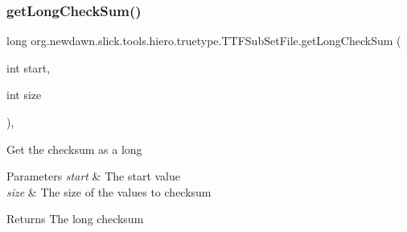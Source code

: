 \subsubsection{\texorpdfstring{get\+Long\+Check\+Sum()}{getLongCheckSum()}}
{\footnotesize\ttfamily long org.\+newdawn.\+slick.\+tools.\+hiero.\+truetype.\+T\+T\+F\+Sub\+Set\+File.\+get\+Long\+Check\+Sum (\begin{DoxyParamCaption}\item[{int}]{start,  }\item[{int}]{size }\end{DoxyParamCaption})\hspace{0.3cm}{\ttfamily [inline]}, {\ttfamily [private]}}

Get the checksum as a long


\begin{DoxyParams}{Parameters}
{\em start} & The start value \\
\hline
{\em size} & The size of the values to checksum \\
\hline
\end{DoxyParams}
\begin{DoxyReturn}{Returns}
The long checksum 
\end{DoxyReturn}

